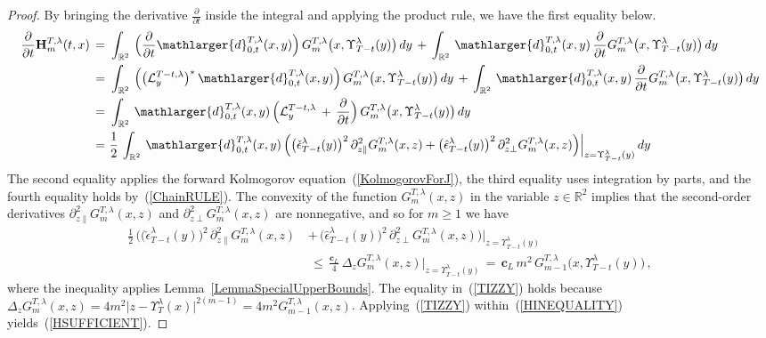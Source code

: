 \documentclass[10pt]{article}
\numberwithin{equation}{section}
\theoremstyle{definition}
\newcommand{\R}{{\mathbb R}}
\newcommand{\Rphi}{{\Upsilon}}
\begin{document}
\begin{appendix}
\begin{proof}
By bringing the derivative $\frac{\partial}{\partial t}$ inside the integral and applying the product rule, we have the first equality below.
\begin{align}\label{HINEQUALITY}
  \frac{\partial}{\partial t} \mathbf{H}_{m}^{T,\lambda}(t,x) \nonumber    \,=\,  &\, \int_{\R^2} \,\Big(\frac{\partial}{\partial t} \mathlarger{d}_{0,t}^{T,\lambda}(x,y)\Big)\,G_{m}^{T,\lambda}\big(x,\Rphi_{T-t}^{\lambda}(y) \big)\, dy \,+\,\int_{\R^2}\,  \mathlarger{d}_{0,t}^{T,\lambda}(x,y) \,\frac{\partial }{\partial t}G_{m}^{T,\lambda}\big(x,\Rphi_{T-t}^{\lambda}(y) \big)\, dy \nonumber \\
  \,=\,  &\, \int_{\R^2} \,\Big(\big(\mathcal{L}^{T-t,\lambda}_y\big)^* \,\mathlarger{d}_{0,t}^{T,\lambda}(x,y)\Big)\,G_{m}^{T,\lambda}\big(x,\Rphi_{T-t}^{\lambda}(y) \big)\, dy \,+\,\int_{\R^2}  \,\mathlarger{d}_{0,t}^{T,\lambda}(x,y) \,\frac{\partial }{\partial t}G_{m}^{T,\lambda}\big(x,\Rphi_{T-t}^{\lambda}(y) \big)\, dy \nonumber \\
  \,=\, &\, \int_{\R^2}  \,\mathlarger{d}_{0,t}^{T,\lambda}(x,y)\,\Big(\mathcal{L}_{y}^{T-t,\lambda}\,+\,\frac{\partial}{\partial t} \Big)  \, G_{m}^{T,\lambda}\big(x,\Rphi_{T-t}^{\lambda}(y) \big)\, dy \nonumber 
  \\
  \,=\, &\,\frac{1}{2}\, \int_{\R^2}  \,\mathlarger{d}_{0,t}^{T,\lambda}(x,y) \,\Big(\big(\check{\epsilon}_{T-t}^{\lambda}(y) \big)^2\,\partial^2_{z\parallel}  G_{m}^{T,\lambda}(x, z) + \big(\hat{\epsilon}_{T-t}^{\lambda}(y) \big)^2 \,\partial^2_{z\perp}  G_{m}^{T,\lambda} (x,z)  \Big)\Big|_{z=\Rphi_{T-t}^{\lambda}(y)}\, dy 
\end{align}
The second equality applies the forward Kolmogorov equation~(\ref{KolmogorovForJ}),
the  third equality uses integration by parts, and the fourth equality  holds by~(\ref{ChainRULE}).  The convexity of the function $G_{m}^{T,\lambda}(x,z)$ in the variable $z\in \R^2$ implies that the second-order derivatives  $\partial^2_{z\parallel}  G_{m}^{T,\lambda}(x,z)$ and $\partial^2_{z\perp}  G_{m}^{T,\lambda}(x,z) $ are nonnegative,
and so for $m\geq 1$ we have  
\begin{align}\label{TIZZY}
\frac{1}{2}\,\Big(\big(\check{\epsilon}_{T-t}^{\lambda}(y) \big)^2\,\partial^2_{z\parallel}  G_{m}^{T,\lambda}(x, z) \,&+\, \big(\hat{\epsilon}_{T-t}^{\lambda}(y) \big)^2 \,\partial^2_{z\perp}  G_{m}^{T,\lambda} (x,z)  \Big)\Big|_{z=\Rphi_{T-t}^{\lambda}(y)} \nonumber \\ & \,\leq \,\frac{\mathbf{c}_L}{4}\,\Delta_z G_{m}^{T,\lambda}(x,z)\Big|_{z=\Rphi_{T-t}^{\lambda}(y)} \,=\,\mathbf{c}_{L}\,m^2 \,G_{m-1}^{T,\lambda}\big(x,\Rphi_{T-t}^{\lambda}(y)  \big) \,,
\end{align}
 where the inequality applies  Lemma~\ref{LemmaSpecialUpperBounds}.
 The equality in~(\ref{TIZZY}) holds because $ \Delta_z G_{m}^{T,\lambda}(x,z)=4m^2\big|z-\Rphi_T^{\lambda}(x)  \big|^{2(m-1)}= 4m^2G_{m-1}^{T,\lambda}(x,z)$.  Applying~(\ref{TIZZY}) within~(\ref{HINEQUALITY}) yields~(\ref{HSUFFICIENT}).
\end{proof}




\end{appendix}
\end{document}
